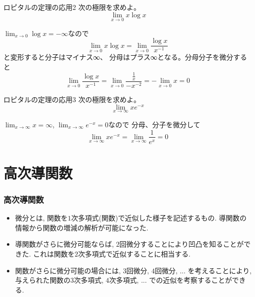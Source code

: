 \begin{slide}{ロピタルの定理の応用2}
次の極限を求めよ。
\begin{equation}
\lim_{x \to 0} x\log{x} \nonumber
\end{equation}
\vspace{5mm}


$\lim_{x\to 0} \log{x} = -\infty$なので
\begin{equation}
\lim_{x \to 0} x\log{x} = \lim_{x\to 0} \frac{\log{x}}{x^{-1}} \nonumber
\end{equation}
と変形すると分子はマイナス∞、 分母はプラス∞となる。分母分子を微分すると
\begin{equation}
\lim_{x\to 0} \frac{\log{x}}{x^{-1}}  = \lim_{x\to 0} \frac{\frac{1}{x}}{-x^{-2}}  = -\lim_{x\to 0} x = 0 \nonumber
\end{equation}

\end{slide}


\begin{slide}{ロピタルの定理の応用3}
次の極限を求めよ。
\begin{equation}
\lim_{x \to \infty} xe^{-x} \nonumber
\end{equation}
\vspace{5mm}


$\lim_{x\to \infty} x  = \infty$,  $\lim_{x\to \infty} e^{-x} = 0$なので
分母、分子を微分して
\begin{equation}
\lim_{x \to \infty} xe^{-x} = \lim_{x \to \infty}\frac{ 1}{e^{x}} = 0  \nonumber
\end{equation}


\end{slide}







\section{高次導関数}


\begin{frame}
\frametitle{高次導関数}


\begin{itemize}
\item 微分とは, 関数を$1$次多項式(関数)で近似した様子を記述するもの. 
導関数の情報から関数の増減の解析が可能になった. 
\item 導関数がさらに微分可能ならば, $2$回微分することにより凹凸を知ることができた. 
これは関数を$2$次多項式で近似することに相当する.
\item 関数がさらに微分可能の場合には, $3$回微分, $4$回微分, ... を考えることにより, 
与えられた関数の$3$次多項式, $4$次多項式, ... での近似を考察することができる. 
\end{itemize}


\end{frame}



